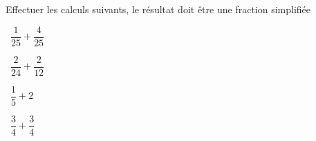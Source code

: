 Effectuer les calculs suivants, le résultat doit être une fraction simplifiée
\begin{questions}
	
	\question[2]  $\dfrac{1}{25} + \dfrac{4}{25}$
	\fillwithdottedlines{3.5cm}
	\begin{solution}
		
	\end{solution}
	
	\question[2]  $\dfrac{2}{24} + \dfrac{2}{12}$
	\fillwithdottedlines{3.5cm}
	\begin{solution}
		
	\end{solution}	
	
	
	
	\question[2]  $\dfrac{1}{5} + 2$
	\fillwithdottedlines{3.5cm}
	\begin{solution}
		
	\end{solution}
	
	\question[2]  $\dfrac{3}{4} + \dfrac{3}{4}$
	\fillwithdottedlines{3.5cm}
	\begin{solution}
		
	\end{solution}
	
	
\end{questions}